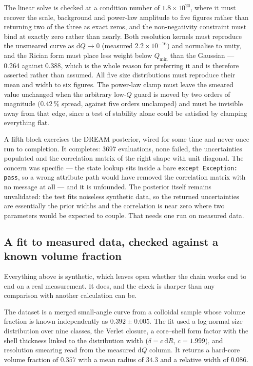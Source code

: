 \documentclass[11pt,a4paper]{article}
\newcommand{\code}[1]{\texttt{\hspace{0pt}#1}}
\begin{document}
The linear solve is checked at a condition number of $1.8\times10^{20}$,
where it must recover the scale, background and power-law amplitude to five
figures rather than returning two of the three as exact zeros, and the
non-negativity constraint must bind at exactly zero rather than nearly. Both
resolution kernels must reproduce the unsmeared curve as
$\mathrm{d}Q \to 0$ (measured $2.2\times10^{-16}$) and normalise to unity,
and the Rician form must place less weight below $Q_{\min}$ than the
Gaussian --- 0.264 against 0.388, which is the whole reason for preferring it
and is therefore asserted rather than assumed. All five size distributions
must reproduce their mean and width to six figures. The power-law clamp must
leave the smeared value unchanged when the arbitrary low-$Q$ guard is moved
by two orders of magnitude (0.42\,\% spread, against five orders unclamped)
and must be invisible away from that edge, since a test of stability alone
could be satisfied by clamping everything flat.

A fifth block exercises the DREAM posterior, wired for some time and never
once run to completion. It completes: 3697 evaluations, none failed, the
uncertainties populated and the correlation matrix of the right shape with
unit diagonal. The concern was specific --- the state lookup sits inside a
bare \code{except Exception: pass}, so a wrong attribute path would have
removed the correlation matrix with no message at all --- and it is
unfounded. The posterior itself remains unvalidated: the test fits noiseless
synthetic data, so the returned uncertainties are essentially the prior
widths and the correlation is near zero where two parameters would be
expected to couple. That needs one run on measured data.

\subsection{A fit to measured data, checked against a known volume fraction}
\label{sec:realdata}

Everything above is synthetic, which leaves open whether the chain works end
to end on a real measurement. It does, and the check is sharper than any
comparison with another calculation can be.

The dataset is a merged small-angle curve from a colloidal sample whose
volume fraction is known independently as $0.392 \pm 0.005$. The fit used a
log-normal size distribution over nine classes, the Verlet closure, a
core--shell form factor with the shell thickness linked to the distribution
width ($\delta = c\,\mathrm{d}R$, $c = 1.999$), and resolution smearing read
from the measured $\mathrm{d}Q$ column. It returns a hard-core volume
fraction of $0.357$ with a mean radius of $34.3$ and a relative width of
$0.086$.
\end{document}
